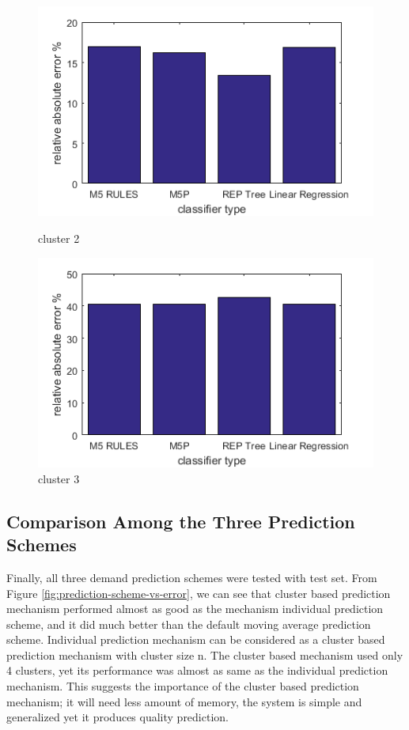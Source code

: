 \begin{figure}
\centering
\begin{minipage}{.5\textwidth}
  \centering
  \includegraphics[width=\linewidth]{cluster-2-diff-classifier-relative-abs.png}
  \caption{cluster 2}
  \label{fig:cluster-2-predictors}
\end{minipage}%
\begin{minipage}{.5\textwidth}
  \centering
  \includegraphics[width=\linewidth]{cluster-3-diff-classifier-relative-abs.png}
  \caption{cluster 3}
\label{fig:cluster-3-predictors}
\end{minipage}

\end{figure}


\subsection{Comparison Among the Three Prediction Schemes}

Finally, all three demand prediction schemes were tested with test set. From Figure \ref{fig:prediction-scheme-vs-error}, we can see that cluster based prediction mechanism performed almost as good as the mechanism individual prediction scheme, and it did much better than the default moving average prediction scheme. Individual prediction mechanism can be considered as a cluster based prediction mechanism with cluster size n. The cluster based mechanism used only 4 clusters, yet its performance was almost as same as the individual prediction mechanism. This suggests the importance of the cluster based prediction mechanism; it will need less amount of memory, the system is simple and generalized yet it produces quality prediction.

